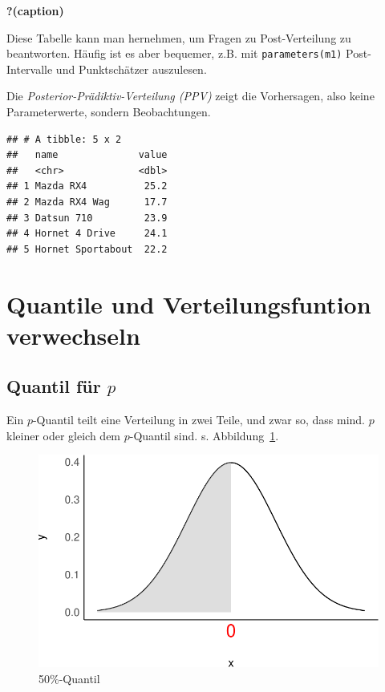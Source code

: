 \documentclass[
  a4paper,
  DIV=11]{scrreprt}
\theoremstyle{definition}
\theoremstyle{remark}
\begin{document}
\begin{table}

\caption{\textbf{?(caption)}}

\end{table}

Diese Tabelle kann man hernehmen, um Fragen zu Post-Verteilung zu
beantworten. Häufig ist es aber bequemer, z.B. mit
\texttt{parameters(m1)} Post-Intervalle und Punktschätzer auszulesen.

Die \emph{Posterior-Prädiktiv-Verteilung (PPV)} zeigt die Vorhersagen,
also keine Parameterwerte, sondern Beobachtungen.

\begin{verbatim}
## # A tibble: 5 x 2
##   name              value
##   <chr>             <dbl>
## 1 Mazda RX4          25.2
## 2 Mazda RX4 Wag      17.7
## 3 Datsun 710         23.9
## 4 Hornet 4 Drive     24.1
## 5 Hornet Sportabout  22.2
\end{verbatim}

\hypertarget{quantile-und-verteilungsfuntion-verwechseln}{%
\section{Quantile und Verteilungsfuntion verwechseln
🤷}\label{quantile-und-verteilungsfuntion-verwechseln}}

\hypertarget{quantil-fuxfcr-p}{%
\subsection{\texorpdfstring{Quantil für
\(p\)}{Quantil für p}}\label{quantil-fuxfcr-p}}

Ein \(p\)-Quantil teilt eine Verteilung in zwei Teile, und zwar so, dass
mind. \(p\) kleiner oder gleich dem \(p\)-Quantil sind. s.
Abbildung~\ref{fig-quantil}.

\begin{figure}

{\centering \includegraphics{./abschluss_files/figure-pdf/fig-quantil-1.pdf}

}

\caption{\label{fig-quantil}50\%-Quantil}

\end{figure}
\end{document}
